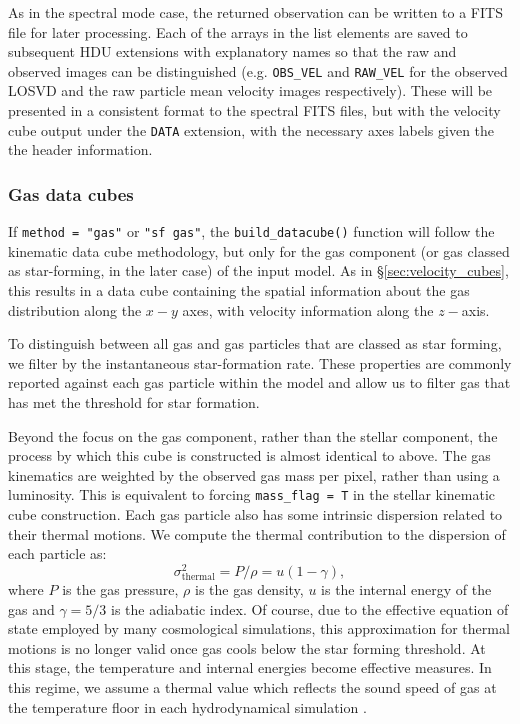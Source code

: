 \documentclass[
  journal=pasa,
  manuscript=research-paper, %
  year=2020,
  volume=37,
]{cup-journal}
\newcommand{\builddatacube}[1]{\texttt{build\_datacube()}#1}
\begin{document}
As in the spectral mode case, the returned observation can be written to a FITS file for later processing.
Each of the arrays in the list elements are saved to subsequent HDU extensions with explanatory names so that the raw and observed images can be distinguished (e.g. \texttt{OBS\_VEL} and \texttt{RAW\_VEL} for the observed LOSVD and the raw particle mean velocity images respectively).
These will be presented in a consistent format to the spectral FITS files, but with the velocity cube output under the \texttt{DATA} extension, with the necessary axes labels given the the header information. 

\subsubsection{Gas data cubes}
If \texttt{method = "gas"} or \texttt{"sf gas"}, the \builddatacube{} function will follow the kinematic data cube methodology, but only for the gas component (or gas classed as star-forming, in the later case) of the input model. 
As in \S\ref{sec:velocity_cubes}, this results in a data cube containing the spatial information about the gas distribution along the $x-y$ axes, with velocity information along the $z-$axis.

To distinguish between all gas and gas particles that are classed as star forming, we filter by the instantaneous star-formation rate.
These properties are commonly reported against each gas particle within the model and allow us to filter gas that has met the threshold for star formation. 

Beyond the focus on the gas component, rather than the stellar component, the process by which this cube is constructed is almost identical to above. 
The gas kinematics are weighted by the observed gas mass per pixel, rather than using a luminosity. 
This is equivalent to forcing \texttt{mass\_flag = T} in the stellar kinematic cube construction.
Each gas particle also has some intrinsic dispersion related to their thermal motions. 
We compute the thermal contribution to the dispersion of each particle as:
\begin{equation}
    \sigma_{\text{thermal}}^2 =  P / \rho =  u (1 - \gamma),
\end{equation}
where $P$ is the gas pressure, $\rho$ is the gas density, $u$ is the internal energy of the gas and $\gamma = 5/3$ is the adiabatic index. 
Of course, due to the effective equation of state employed by many cosmological simulations, this approximation for thermal motions is no longer valid once gas cools below the star forming threshold.
At this stage, the temperature and internal energies become effective measures. 
In this regime, we assume a thermal value which reflects the sound speed of gas at the temperature floor in each hydrodynamical simulation \citep{Pillepich2019TNG50Gas, Jimenez2023PhysicsGasEagle}. 
\end{document}
